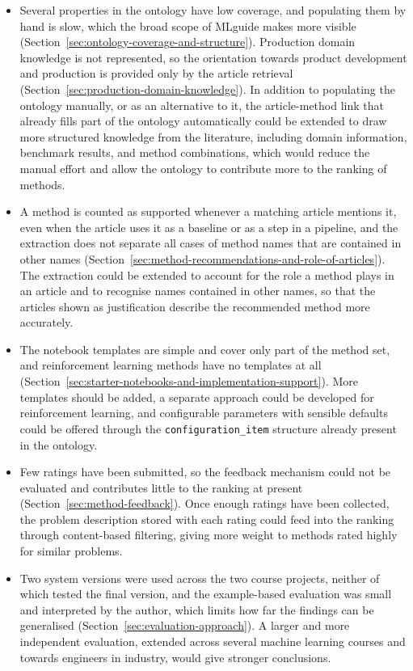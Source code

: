 \begin{itemize}
    \item Several properties in the ontology have low coverage, and 
    populating them by hand is slow, which the broad scope of MLguide 
    makes more visible 
    (Section~\ref{sec:ontology-coverage-and-structure}). Production 
    domain knowledge is not represented, so the orientation towards 
    product development and production is provided only by the article 
    retrieval (Section~\ref{sec:production-domain-knowledge}). In 
    addition to populating the ontology manually, or as an alternative 
    to it, the article-method link that already fills part of the 
    ontology automatically could be extended to draw more structured 
    knowledge from the literature, including domain information, 
    benchmark results, and method combinations, which would reduce the 
    manual effort and allow the ontology to contribute more to the 
    ranking of methods.

    \item A method is counted as supported whenever a matching article 
    mentions it, even when the article uses it as a baseline or as a 
    step in a pipeline, and the extraction does not separate all cases of 
    method names that are contained in other names
    (Section~\ref{sec:method-recommendations-and-role-of-articles}). 
    The extraction could be extended to account for the role a method 
    plays in an article and to recognise names contained in other 
    names, so that the articles shown as justification describe the 
    recommended method more accurately.

    \item The notebook templates are simple and cover only part of the 
    method set, and reinforcement learning methods have no templates at all
    (Section~\ref{sec:starter-notebooks-and-implementation-support}). 
    More templates should be added, a separate approach could be 
    developed for reinforcement learning, and configurable parameters 
    with sensible defaults could be offered through the 
    \texttt{configuration\_item} structure already present in the 
    ontology.

    \item Few ratings have been submitted, so the feedback mechanism 
    could not be evaluated and contributes little to the ranking at 
    present (Section~\ref{sec:method-feedback}). Once enough ratings 
    have been collected, the problem description stored with each 
    rating could feed into the ranking through content-based 
    filtering, giving more weight to methods rated highly for similar 
    problems.

    \item Two system versions were used across the two course projects, 
    neither of which tested the final version, and the example-based 
    evaluation was small and interpreted by the author, which limits 
    how far the findings can be generalised 
    (Section~\ref{sec:evaluation-approach}). A larger and more 
    independent evaluation, extended across several machine learning 
    courses and towards engineers in industry, would give stronger 
    conclusions.
\end{itemize}